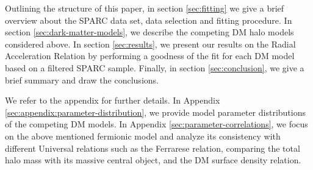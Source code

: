 


Outlining the structure of this paper, in section \ref{sec:fitting} we give a brief overview about the SPARC data set, data selection and fitting procedure. In section \ref{sec:dark-matter-models}, we describe the competing DM halo models considered above. In section \ref{sec:results}, we present our results on the Radial Acceleration Relation by performing a goodness of the fit for each DM model based on a filtered SPARC sample. Finally, in section \ref{sec:conclusion}, we give a brief summary and draw the conclusions.

We refer to the appendix for further details. In Appendix \ref{sec:appendix:parameter-distribution}, we provide model parameter distributions of the competing DM models. In Appendix \ref{sec:parameter-correlations}, we focus on the above mentioned fermionic model and analyze its consistency with different Universal relations such as the Ferrarese relation, comparing the total halo mass with its massive central object, and the DM surface density relation.
